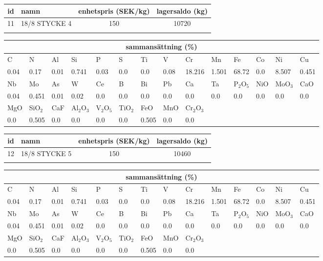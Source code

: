 \begin{center}
{\scriptsize\addtolength{\tabcolsep}{-3pt}
\begin{tabular}{clcc}
id&namn&enhetspris (SEK/kg)&lagersaldo (kg)\\
\hline
11&18/8 STYCKE 4&150&10720\\\\
\end{tabular}
\begin{tabular}{llllllllllllll}
\multicolumn{14}{c}{sammansättning (\%)}\\
\hline
C&N&Al&Si&P&S&Ti&V&Cr&Mn&Fe&Co&Ni&Cu\\
\hline
0.04&0.17&0.01&0.741& 0.03&0.0&0.0&0.08& 18.216&1.501&68.72&0.0& 8.507&0.451\\
\hline
Nb&Mo&As&W&Ce&B&Bi&Pb&Ca&Ta&P$_2$O$_5$&NiO&MoO$_3$&CaO\\
\hline
0.04& 0.451& 0.01& 0.02& 0.0& 0.0& 0.0& 0.0& 0.0& 0.0& 0.0& 0.0& 0.0& 0.0\\
\hline
MgO&SiO$_2$&CaF&Al$_2$O$_3$&V$_2$O$_5$&TiO$_2$&FeO&MnO&Cr$_2$O$_3$\\
\hline
0.0& 0.505& 0.0& 0.0& 0.0& 0.0& 0.505& 0.0& 0.0\\
\end{tabular}
}
\end{center}

\begin{center}
{\scriptsize\addtolength{\tabcolsep}{-3pt}
\begin{tabular}{clcc}
id&namn&enhetspris (SEK/kg)&lagersaldo (kg)\\
\hline
12&18/8 STYCKE 5&150&10460\\\\
\end{tabular}
\begin{tabular}{llllllllllllll}
\multicolumn{14}{c}{sammansättning (\%)}\\
\hline
C&N&Al&Si&P&S&Ti&V&Cr&Mn&Fe&Co&Ni&Cu\\
\hline
0.04&0.17&0.01&0.741& 0.03&0.0&0.0&0.08& 18.216&1.501&68.72&0.0& 8.507&0.451\\
\hline
Nb&Mo&As&W&Ce&B&Bi&Pb&Ca&Ta&P$_2$O$_5$&NiO&MoO$_3$&CaO\\
\hline
0.04& 0.451& 0.01& 0.02& 0.0& 0.0& 0.0& 0.0& 0.0& 0.0& 0.0& 0.0& 0.0& 0.0\\
\hline
MgO&SiO$_2$&CaF&Al$_2$O$_3$&V$_2$O$_5$&TiO$_2$&FeO&MnO&Cr$_2$O$_3$\\
\hline
0.0& 0.505& 0.0& 0.0& 0.0& 0.0& 0.505& 0.0& 0.0\\
\end{tabular}
}
\end{center}

